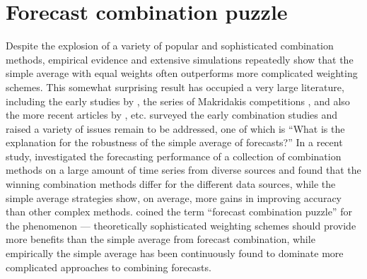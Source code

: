 \documentclass[11pt]{article}
\begin{document}
\section{Forecast combination puzzle}
\label{sec:puzzle}

Despite the explosion of a variety of popular and sophisticated combination methods, empirical evidence and extensive simulations repeatedly show that the simple average with equal weights often outperforms more complicated weighting schemes. This somewhat surprising result has occupied a very large literature, including the early studies by \citet{Stock1998-np,Stock2003-sp,Stock2004-rq}, the series of Makridakis competitions \citep{Makridakis1982-hb,Makridakis2000-he,Makridakis2020-hu}, and also the more recent articles by \citet{Blanc2016-sn,Blanc2020-pg}, etc. \citet{Clemen1989-fb} surveyed the early combination studies and raised a variety of issues remain to be addressed, one of which is ``What is the explanation for the robustness of the simple average of forecasts?'' In a recent study, \citet{Gastinger2021-ey} investigated the forecasting performance of a collection of combination methods on a large amount of time series from diverse sources and found that the winning combination methods differ for the different data sources, while the simple average strategies show, on average, more gains in improving accuracy than other complex methods. \citet{Stock2004-rq} coined the term ``forecast combination puzzle'' for the phenomenon --- theoretically sophisticated weighting schemes should provide more benefits than the simple average from forecast combination, while empirically the simple average has been continuously found to dominate more complicated approaches to combining forecasts.
\end{document}
